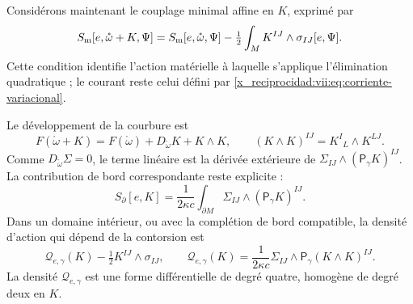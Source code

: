 \begin{HMTCompactSection}
Considérons maintenant le couplage minimal affine en \(K\), exprimé par
\begin{equation}
 S_{\rm m}[e,\mathring\omega+K,\Psi]
 =S_{\rm m}[e,\mathring\omega,\Psi]
   -\tfrac12\int_M K^{IJ}\wedge\sigma_{IJ}[e,\Psi].
 \label{x_reciprocidad:vii:eq:materia-afin-contorsion}
\end{equation}
Cette condition identifie l'action matérielle à laquelle s'applique
l'élimination quadratique ; le courant reste celui défini par
\eqref{x_reciprocidad:vii:eq:corriente-variacional}.

Le développement de la courbure est
\begin{equation}
 F(\mathring\omega+K)
 =F(\mathring\omega)+D_{\mathring\omega}K+K\wedge K,
 \qquad (K\wedge K)^{IJ}=K^I{}_{L}\wedge K^{LJ}.
 \label{x_reciprocidad:vii:eq:curvatura-contorsion}
\end{equation}
Comme \(D_{\mathring\omega}\Sigma=0\), le terme linéaire est la
dérivée extérieure de \(\Sigma_{IJ}\wedge(\mathsf P_\gamma K)^{IJ}\).
La contribution de bord correspondante reste explicite :
\begin{equation}
 S_\partial[e,K]=\frac1{2\kappa c}
     \int_{\partial M}\Sigma_{IJ}\wedge(\mathsf P_\gamma K)^{IJ}.
 \label{x_reciprocidad:vii:eq:borde-contorsion}
\end{equation}
Dans un domaine intérieur, ou avec la complétion de bord compatible,
la densité d'action qui dépend de la contorsion est
\begin{equation}
 \mathcal Q_{e,\gamma}(K)-\tfrac12K^{IJ}\wedge\sigma_{IJ},
 \qquad
 \mathcal Q_{e,\gamma}(K)
  =\frac1{2\kappa c}\Sigma_{IJ}\wedge
                         \mathsf P_\gamma(K\wedge K)^{IJ}.
 \label{x_reciprocidad:vii:eq:forma-cuadratica-contorsion}
\end{equation}
La densité \(\mathcal Q_{e,\gamma}\) est une forme différentielle de
degré quatre, homogène de degré deux en \(K\).


\end{HMTCompactSection}
